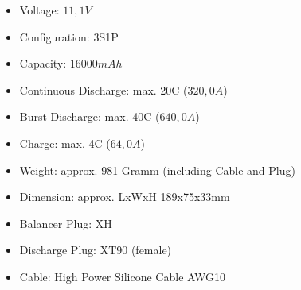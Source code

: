 \begin{itemize}
    \item Voltage: $11,1V$
    \item Configuration: 3S1P
    \item Capacity: $16000mAh$
    \item Continuous Discharge: max. 20C ($320,0A$)
    \item Burst Discharge: max. 40C ($640,0A$)
    \item Charge: max. 4C ($64,0A$)
    \item Weight: approx. 981 Gramm (including Cable and Plug)
    \item Dimension: approx. LxWxH 189x75x33mm
    \item Balancer Plug: XH
    \item Discharge Plug: XT90 (female)
    \item Cable: High Power Silicone Cable AWG10
\end{itemize}



